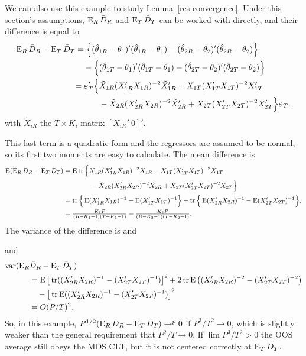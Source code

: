 \documentclass[12pt]{article}
\begin{document}
We can also use this example to study Lemma~\ref{res-convergence}.
Under this section's assumptions, $\operatorname{E}_R \bar{D}_{R}$ and $\operatorname{E}_T \bar{D}_{T}$ can be
worked with directly, and their difference is equal to
\begin{equation}
  \begin{split}
    \operatorname{E}_R \bar{D}_{R} - \operatorname{E}_T \bar{D}_{T} &= \Big\{(\hat\theta_{1R} - \theta_1)'(\hat\theta_{1R} -
    \theta_1) -
    (\hat\theta_{2R} - \theta_2)'(\hat\theta_{2R} - \theta_2)\Big\} \\
    & \quad - \Big\{(\hat\theta_{1T} - \theta_1)'(\hat\theta_{1T} - \theta_1) -
    (\hat\theta_{2T} - \theta_2)'(\hat\theta_{2T} - \theta_2)\Big\} \\
    &\begin{split}
      =\boldsymbol{\varepsilon}_{T}'\Big\{
      & \tilde{X}_{1R}(X_{1R}'X_{1R})^{-2} \tilde{X}_{1R}'
      - X_{1T}(X_{1T}'X_{1T})^{-2} X_{1T}' \\
      & - \tilde{X}_{2R}(X_{2R}'X_{2R})^{-2} \tilde{X}_{2R}'
      + X_{2T}(X_{2T}'X_{2T})^{-2} X_{2T}'
      \Big\}\boldsymbol{\varepsilon}_{T}.
    \end{split}
  \end{split}
\end{equation}
with $\tilde{X}_{iR}$ the $T \times K_i$ matrix $[X_{iR}'\ 0]'$.

This last term is a quadratic form and the regressors are assumed to
be normal, so its first two moments are easy to calculate. The mean
difference is
\begin{equation}
  \begin{split}
  \operatorname{E}(\operatorname{E}_R \bar{D}_{R} - \operatorname{E}_T \bar{D}_{T})
      &=\operatorname{E} \operatorname{tr} \Big\{
        \tilde{X}_{1R}(X_{1R}'X_{1R})^{-2} \tilde{X}_{1R}
      - X_{1T}(X_{1T}'X_{1T})^{-2} X_{1T} \\
      & \qquad\qquad- \tilde{X}_{2R}(X_{2R}'X_{2R})^{-2} \tilde{X}_{2R}
      + X_{2T}(X_{2T}'X_{2T})^{-2} X_{2T} \Big\} \\
      &= \operatorname{tr} \Big\{\operatorname{E} (X_{1R}'X_{1R})^{-1}
         - \operatorname{E} (X_{1T}'X_{1T})^{-1} \Big\}
         - \operatorname{tr} \Big\{\operatorname{E} (X_{2R}'X_{2R})^{-1}
         - \operatorname{E} (X_{2T}'X_{2T})^{-1} \Big\}, \\
      &= \tfrac{K_1 P}{(R-K_1-1)(T-K_1-1)} - \tfrac{K_2 P}{(R-K_2-1)(T-K_2-1)}.
    \end{split}
\end{equation}
The variance of the difference is
and

and
\begin{align*}
  \operatorname{var}(\operatorname{E}_R & \bar{D}_{R} - \operatorname{E}_T \bar{D}_{T}) \\ &= \operatorname{E}
  \big[\operatorname{tr}((X_{2R}'X_{2R})^{-1} - (X_{2T}'X_{2T})^{-1})\big]^2 + 2 \operatorname{tr}
  \operatorname{E}\big((X_{2R}'X_{2R})^{-2} - (X_{2T}'X_{2T})^{-2}\big) \\ &\quad - \big[\operatorname{tr}
  \operatorname{E}((X_{2R}'X_{2R})^{-1} - (X_{2T}'X_{2T})^{-1}) \big]^2 \\ &=
  O(P/T)^2.
\end{align*}
So, in this example, $P^{1/2}(\operatorname{E}_R \bar{D}_{R} - \operatorname{E}_T \bar{D}_{T}) \to^p 0$
if $P^3/T^2 \to 0$, which is slightly weaker than the general
requirement that $P^2/T \to 0$.  If $\lim P^3/T^2 > 0$ the OOS average
still obeys the MDS CLT, but it is not centered correctly at $\operatorname{E}_T
\bar{D}_{T}$.
\end{document}
